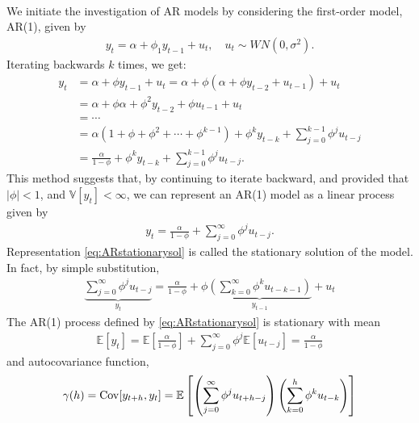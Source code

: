 \begin{eg}[AR(1) Process]\label{eg:AR1}
    \

    We initiate the investigation of AR models by considering the first-order model, AR(1), given by
    \begin{gather}\label{eq:AR1}
        y_t = \alpha + \phi_1 y_{t-1} + u_t, \quad u_t \sim WN(0, \sigma^2).
    \end{gather}
    Iterating backwards $k$ times, we get:
    \begin{align*}
        y_t &= \alpha + \phi y_{t-1} + u_t = \alpha + \phi \left( \alpha + \phi y_{t-2} + u_{t-1} \right) + u_t\\
        &= \alpha + \phi \alpha + \phi^2 y_{t-2} + \phi u_{t-1} + u_t\\
        &= \cdots \\
        &= \alpha \left( 1 + \phi + \phi^2 + \cdots + \phi^{k-1} \right) + \phi^k y_{t-k} + \sum_{j=0}^{k-1} \phi^j u_{t-j} \\
        &= \frac{\alpha}{1-\phi} + \phi^k y_{t-k} + \sum_{j=0}^{k-1} \phi^j u_{t-j}.
    \end{align*}
    This method suggests that, by continuing to iterate backward, and provided that $\vert \phi \vert < 1$,
    and $\mathbb{V}[y_t] < \infty$, we can represent an AR(1) model as a linear process given by
    \begin{gather}\label{eq:ARstationarysol}
        y_t = \frac{\alpha}{1-\phi} + \sum_{j=0}^{\infty} \phi^j u_{t-j}.
    \end{gather}
    Representation \ref{eq:ARstationarysol} is called the stationary solution of the model.
    In fact, by simple substitution,
    \begin{gather*}
        \underset{y_t}{\underbrace{\sum_{j=0}^{\infty} \phi^j u_{t-j}}} = \frac{\alpha}{1-\phi} +  \phi \underset{y_{t-1}}{\underbrace{\left(\sum_{k=0}^{\infty} \phi^k u_{t-k-1}\right)}} + u_t
    \end{gather*}
    The AR(1) process defined by \ref{eq:ARstationarysol} is stationary with mean
    \begin{gather*}
        \mathbb{E}[y_t] = \mathbb{E}\left[\frac{\alpha}{1-\phi}\right] + \sum_{j=0}^{\infty} \phi^j \mathbb{E}[u_{t-j}] = \frac{\alpha}{1-\phi}
    \end{gather*}
    and autocovariance function,
    \begin{align*}
        \gamma(h) &= \Cov[y_{t+h}, y_t] = \mathbb{E}\left[ \left( \sum_{j=0}^{\infty} \phi^j u_{t+h-j} \right) \left( \sum_{k=0}^{h} \phi^k u_{t-k} \right) \right] \\

\end{align*}
\end{eg}
